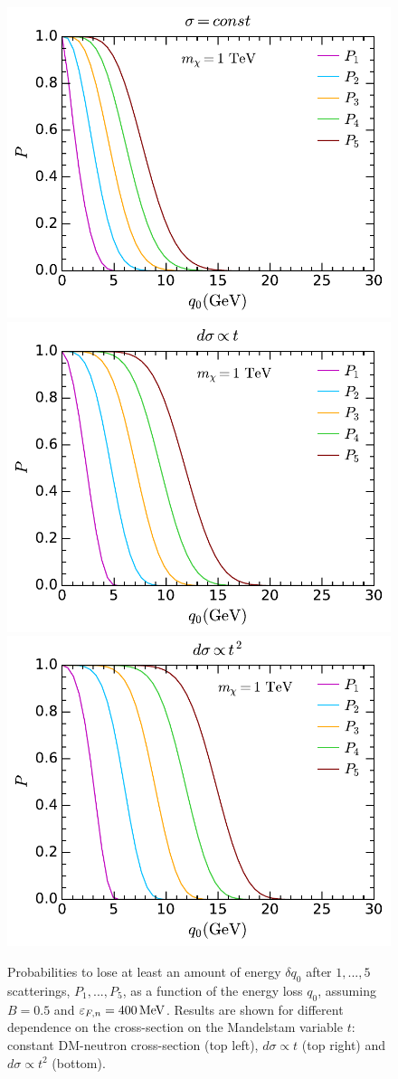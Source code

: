 \begin{figure}[t]
    \centering
    \includegraphics[width=.48\textwidth]{capture_1/probs_n0.pdf}
    \includegraphics[width=.48\textwidth]{capture_1/probs_n1.pdf}\\
    \includegraphics[width=.48\textwidth]{capture_1/probs_n2.pdf}
    \caption[Probabilities to lose at least an amount of energy $\delta q_0$  after $1,...,5$ scatterings,  $P_1,...,P_5$, as a function of the energy loss $q_0$,  assuming $B=0.5$ and $\kinFn=400\MeV$.]{Probabilities to lose at least an amount of energy $\delta q_0$  after $1,...,5$ scatterings,  $P_1,...,P_5$, as a function of the energy loss $q_0$,  assuming $B=0.5$ and $\kinFn=400\MeV$. Results are shown for different dependence on the cross-section on the Mandelstam variable $t$: constant DM-neutron cross-section (top left), $d\sigma\propto t$ (top right) and $d\sigma\propto t^2$ (bottom). }
    \label{ch3:fig:pn}
\end{figure}



